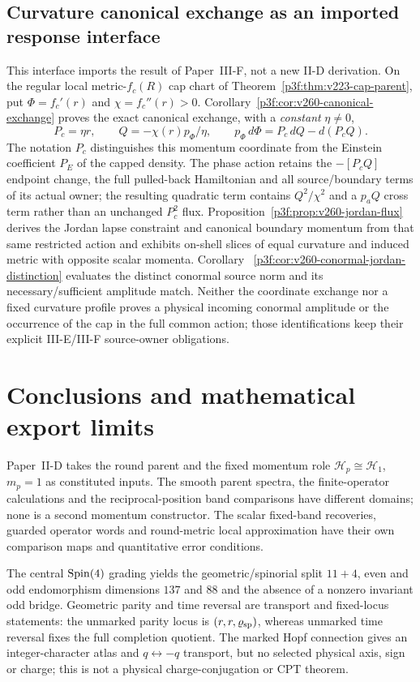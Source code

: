 \documentclass[12pt,a4paper]{article}
\begin{document}
\subsection{Curvature canonical exchange as an imported response interface}
\label{p2d:sec:v229-curvature-polarization}
This interface imports the result of Paper~III-F, not a
new II-D derivation. On the regular local metric-$f_c(R)$ cap chart of
Theorem~\ref{p3f:thm:v223-cap-parent}, put $\Phi=f_c'(r)$ and
$\chi=f_c''(r)>0$. Corollary~\ref{p3f:cor:v260-canonical-exchange}
proves the exact canonical exchange, with a \emph{constant} $\eta\ne0$,
\[
 P_c=\eta r,\qquad Q=-\chi(r)p_\Phi/\eta,\qquad
 p_\Phi\,d\Phi=P_c\,dQ-d(P_cQ).
\]
The notation $P_c$ distinguishes this momentum coordinate from the
Einstein coefficient $P_E$ of the capped density. The phase action
retains the $-[P_cQ]$ endpoint change, the full pulled-back Hamiltonian
and all source/boundary terms of its actual owner; the resulting
quadratic term contains $Q^2/\chi^2$ and a $p_aQ$ cross term rather
than an unchanged $P_c^2$ flux.
Proposition~\ref{p3f:prop:v260-jordan-flux} derives the Jordan lapse
constraint and canonical boundary momentum from that same restricted
action and exhibits on-shell slices of equal curvature and induced
metric with opposite scalar momenta. Corollary~
\ref{p3f:cor:v260-conormal-jordan-distinction} evaluates the distinct
conormal source norm and its necessary/sufficient amplitude match.
Neither the coordinate exchange nor a fixed curvature profile proves
a physical incoming conormal amplitude or the occurrence of the cap
in the full common action; those identifications keep their explicit
III-E/III-F source-owner obligations.


\section{Conclusions and mathematical export limits}
Paper~II-D takes the round parent and the fixed momentum role
$\mathcal H_p\cong\mathcal H_1$, $m_p=1$ as constituted inputs.
The smooth parent spectra, the finite-operator calculations and the
reciprocal-position band comparisons have different domains; none is a
second momentum constructor. The scalar fixed-band recoveries, guarded
operator words and round-metric local approximation have their own
comparison maps and quantitative error conditions.

The central $\mathrm{Spin}(4)$ grading yields the geometric/spinorial split
$11+4$, even and odd endomorphism dimensions $137$ and $88$ and the
absence of a nonzero invariant odd bridge. Geometric parity and time
reversal are transport and fixed-locus statements: the unmarked parity
locus is $(r,r,\varrho_{\rm sp})$, whereas unmarked time reversal fixes
the full completion quotient. The marked Hopf connection gives an
integer-character atlas and $q\leftrightarrow-q$ transport, but no
selected physical axis, sign or charge; this is not a physical
charge-conjugation or CPT theorem.
\end{document}

